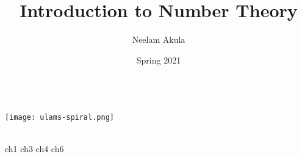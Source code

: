 \documentclass[fullpage]{article}
\title{Introduction to Number Theory}
\author{Neelam Akula}
\date{Spring 2021}
\newif\ifintro
\begin{document}
\makeatletter
    \begin{titlepage}
        \begin{center}
            {\huge \bfseries  \@title }\\[4ex]
			\texttt{[image: ulams-spiral.png]}\\[4ex]
            {\large  \@author}\\[4ex] 
            {\large \@date}
        \end{center}
    \end{titlepage}
\makeatother

\tableofcontents
\newpage

\ifintro
\section*{Introduction}
\rule{\textwidth}{1pt}
\vspace{1.5in}
\paragraph{}
    This is a compilation of notes and homeworks for MATH 406,
    Introduction to Number Theory, to aid both current and future students
    in fully understanding the material. 
    The primary text used is \emph{Elementary Number Theory}, by Kenneth H. Rosen, 6th
    Edition. While the text is not required it is an excellent resource for additional
    problems. Chapters covered from the text are 1, 3, 4, 6, 7, 9, 8, and 11 in that order. With two
    midterms following chapters 1, 3, 4 and chapters 6, 7, 9. The final is cumulative with an
    emphasis on chapters 8 and 11.
    Lastly, the course is taught by Dr. Justin Wyss-Gallifent, on his personal site there are
    brief versions of each section's lecture notes. A list of his notes can be found
    \href{https://www.math.umd.edu/~immortal/MATH406/}{here}.
\addcontentsline{toc}{section}{Introduction}
\newpage
\fi

{ch1}
\newpage
{ch3}
\newpage
{ch4}
\newpage
{ch6}
\newpage
\end{document}
